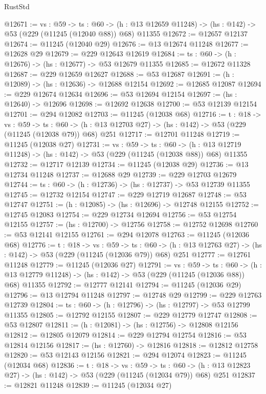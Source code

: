\begin{lexlean}{RustStd}
\begin{coremodule}
@12671 := {vs : @59} ->
  {ts : @60} ->
  (h : @13 @12659 @11248) -> (hs : @142) -> @53 (@229 (@11245 (@12040 @88)) @68) @11355
@12672 := @12657 @12137
@12674 := @11245 (@12040 @29)
@12676 := @13 @12674 @11248
@12677 := @12628 @29
@12679 := @229 @12643 @12619
@12684 := {ts : @60} -> (h : @12676) -> (hs : @12677) -> @53 @12679 @11355
@12685 := @12672 @11328
@12687 := @229 @12659 @12627
@12688 := @53 @12687
@12691 := (h : @12089) -> (hs : @12636) -> @12688 @12154
@12692 := @12685 @12087
@12694 := @229 @12674 @12634
@12696 := @53 @12694 @12154
@12697 := (hs : @12640) -> @12696
@12698 := @12692 @12638
@12700 := @53 @12139 @12154
@12701 := @294 @12082
@12703 := @11245 (@12038 @68)
@12716 := {t : @18} ->
  {vs : @59} ->
  {ts : @60} -> (h : @13 @12703 @27) -> (hs : @142) -> @53 (@229 (@11245 (@12038 @79)) @68) @251
@12717 := @12701 @11248
@12719 := @11245 (@12038 @27)
@12731 := {vs : @59} ->
  {ts : @60} ->
  (h : @13 @12719 @11248) -> (hs : @142) -> @53 (@229 (@11245 (@12038 @88)) @68) @11355
@12732 := @12717 @12139
@12734 := @11245 (@12038 @29)
@12736 := @13 @12734 @11248
@12737 := @12688 @29
@12739 := @229 @12703 @12679
@12744 := {ts : @60} -> (h : @12736) -> (hs : @12737) -> @53 @12739 @11355
@12745 := @12732 @12154
@12747 := @229 @12719 @12687
@12748 := @53 @12747
@12751 := (h : @12085) -> (hs : @12696) -> @12748 @12155
@12752 := @12745 @12083
@12754 := @229 @12734 @12694
@12756 := @53 @12754 @12155
@12757 := (hs : @12700) -> @12756
@12758 := @12752 @12698
@12760 := @53 @12141 @12155
@12761 := @294 @12078
@12763 := @11245 (@12036 @68)
@12776 := {t : @18} ->
  {vs : @59} ->
  {ts : @60} -> (h : @13 @12763 @27) -> (hs : @142) -> @53 (@229 (@11245 (@12036 @79)) @68) @251
@12777 := @12761 @11248
@12779 := @11245 (@12036 @27)
@12791 := {vs : @59} ->
  {ts : @60} ->
  (h : @13 @12779 @11248) -> (hs : @142) -> @53 (@229 (@11245 (@12036 @88)) @68) @11355
@12792 := @12777 @12141
@12794 := @11245 (@12036 @29)
@12796 := @13 @12794 @11248
@12797 := @12748 @29
@12799 := @229 @12763 @12739
@12804 := {ts : @60} -> (h : @12796) -> (hs : @12797) -> @53 @12799 @11355
@12805 := @12792 @12155
@12807 := @229 @12779 @12747
@12808 := @53 @12807
@12811 := (h : @12081) -> (hs : @12756) -> @12808 @12156
@12812 := @12805 @12079
@12814 := @229 @12794 @12754
@12816 := @53 @12814 @12156
@12817 := (hs : @12760) -> @12816
@12818 := @12812 @12758
@12820 := @53 @12143 @12156
@12821 := @294 @12074
@12823 := @11245 (@12034 @68)
@12836 := {t : @18} ->
  {vs : @59} ->
  {ts : @60} -> (h : @13 @12823 @27) -> (hs : @142) -> @53 (@229 (@11245 (@12034 @79)) @68) @251
@12837 := @12821 @11248
@12839 := @11245 (@12034 @27)

\end{coremodule}
\end{lexlean}
